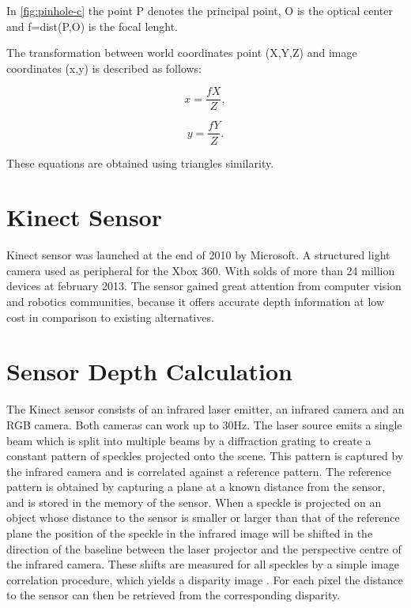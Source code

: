 In \ref{fig:pinhole-c} the point P denotes the principal point, O is the optical center and 
f=dist(P,O) is the focal lenght.

The transformation between world coordinates point (X,Y,Z) and image coordinates (x,y) is described as 
follows:

\begin{equation}
\label{eq:disparity2}
 x = \frac{fX}{Z},
\end{equation}

\begin{equation}
\label{eq:disparity2}
 y = \frac{fY}{Z}.
\end{equation}

These equations are  obtained using triangles similarity.

\section{Kinect Sensor}

Kinect sensor was launched at the end of 2010 by Microsoft. A structured light camera 
used as peripheral for the Xbox 360. With solds of more than 24 million devices at february 2013.
The sensor gained great attention from computer vision and robotics communities, because it offers 
accurate depth information at low cost in comparison to existing alternatives.

\section{Sensor Depth Calculation}

The Kinect sensor consists of an infrared laser emitter, an 
infrared camera and an RGB camera. Both cameras can work up to 30Hz. 
The laser source emits a single 
beam which is split into multiple beams by a diffraction 
grating to create a constant 
pattern of speckles projected onto the scene. This pattern is 
captured by the infrared camera and is correlated against a 
reference pattern. The reference pattern is obtained by capturing 
a plane at a known distance from the sensor, and is stored in the 
memory of the sensor. When a speckle is projected on an object 
whose distance to the sensor is smaller or larger than that of the 
reference plane the position of the speckle in the infrared image 
will be shifted in the direction of the baseline between the laser 
projector and the perspective centre of the infrared camera. 
These shifts are measured for all speckles by a simple image 
correlation procedure, which yields a disparity image \cite{khoshelham2011accuracy} . For each 
pixel the distance to the sensor can then be retrieved from the 
corresponding disparity.




